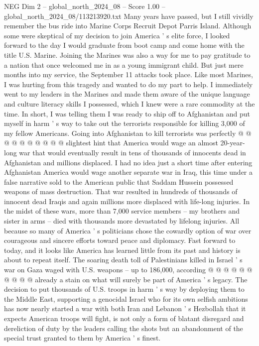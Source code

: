 \begin{textsample}{NEG Dim 2 – global\_north\_2024\_08 – Score 1.00 – global\_north\_2024\_08/113213920.txt}  \label{ex:f2_neg_361}
Many years have passed, but I still vividly remember the bus ride into Marine Corps Recruit Depot Parris Island.
Although some were skeptical of my decision to join America ' s elite force, I looked forward to the day I would graduate from boot camp and come home with the title U.S.
Marine.
Joining the Marines was also a way for me to pay gratitude to a nation that once welcomed me in as a young immigrant child.
But just mere months into my service, the September 11 attacks took place.
Like most Marines, I was hurting from this tragedy and wanted to do my part to help.
I immediately went to my leaders in the Marines and made them aware of the unique language and culture literacy skills I possessed, which I knew were a rare commodity at the time.
In short, I was telling them I was ready to ship off to Afghanistan and put myself in harm ' s way to take out the terrorists responsible for killing 3,000 of my fellow Americans.
Going into Afghanistan to kill terrorists was perfectly @ @ @ @ @ @ @ @ @ @ slightest hint that America would wage an almost 20-year-long war that would eventually result in tens of thousands of innocents dead in Afghanistan and millions displaced.
I had no idea just a short time after entering Afghanistan America would wage another separate war in Iraq, this time under a false narrative sold to the American public that Saddam Hussein possessed weapons of mass destruction.
That war resulted in hundreds of thousands of innocent dead Iraqis and again millions more displaced with life-long injuries.
In the midst of these wars, more than 7,000 service members -- my brothers and sister in arms -- died with thousands more devastated by lifelong injuries.
All because so many of America ' s politicians chose the cowardly option of war over courageous and sincere efforts toward peace and diplomacy.
Fast forward to today, and it looks like America has learned little from its past and history is about to repeat itself.
The soaring death toll of Palestinians killed in Israel ' s war on Gaza waged with U.S. weapons -- up to 186,000, according @ @ @ @ @ @ @ @ @ @ already a stain on what will surely be part of America ' s legacy.
The decision to put thousands of U.S. troops in harm ' s way by deploying them to the Middle East, supporting a genocidal Israel who for its own selfish ambitions has now nearly started a war with both Iran and Lebanon ' s Hezbollah that it expects American troops will fight, is not only a form of blatant disregard and dereliction of duty by the leaders calling the shots but an abandonment of the special trust granted to them by America ' s finest.

\end{textsample}
